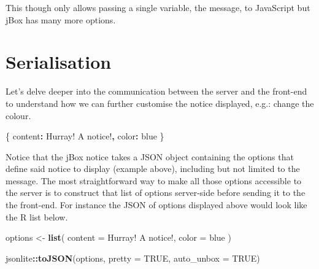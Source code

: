 \documentclass[
]{krantz}
\makeatletter
\newenvironment{Shaded}{\begin{snugshade}}{\end{snugshade}}
\newcommand{\DataTypeTok}[1]{\textcolor[rgb]{0.27,0.27,0.27}{#1}}
\newcommand{\KeywordTok}[1]{\textcolor[rgb]{0.27,0.27,0.27}{\textbf{#1}}}
\newcommand{\NormalTok}[1]{#1}
\newcommand{\OperatorTok}[1]{\textcolor[rgb]{0.43,0.43,0.43}{\textbf{#1}}}
\newcommand{\OtherTok}[1]{\textcolor[rgb]{0.37,0.37,0.37}{#1}}
\newcommand{\StringTok}[1]{\textcolor[rgb]{0.5,0.5,0.5}{#1}}
\newenvironment{kframe}{%
\medskip{}
\setlength{\fboxsep}{.8em}
 \def\at@end@of@kframe{}%
 \ifinner\ifhmode%
  \def\at@end@of@kframe{\end{minipage}}%
  \begin{minipage}{\columnwidth}%
 \fi\fi%
 \def\FrameCommand##1{\hskip\@totalleftmargin \hskip-\fboxsep
 \colorbox{shadecolor}{##1}\hskip-\fboxsep
     \hskip-\linewidth \hskip-\@totalleftmargin \hskip\columnwidth}%
 \MakeFramed {\advance\hsize-\width
   \@totalleftmargin\z@ \linewidth\hsize
   \@setminipage}}%
 {\par\unskip\endMakeFramed%
 \at@end@of@kframe}
\renewenvironment{Shaded}{\begin{kframe}}{\end{kframe}}
\makeatother
\begin{document}
\begin{Shaded}
\end{Shaded}

This though only allows passing a single variable, the message, to JavaScript but jBox has many more options.

\hypertarget{serialisation}{%
\section*{Serialisation}\label{serialisation}}


Let's delve deeper into the communication between the server and the front-end to understand how we can further customise the notice displayed, e.g.: change the colour.

\begin{Shaded}
\begin{Highlighting}[]
\NormalTok{\{}
  \DataTypeTok{content}\OperatorTok{:} \StringTok{\textquotesingle{}Hurray! A notice!\textquotesingle{}}\OperatorTok{,}
  \DataTypeTok{color}\OperatorTok{:} \StringTok{\textquotesingle{}blue\textquotesingle{}}
\NormalTok{\}}
\end{Highlighting}
\end{Shaded}

Notice that the jBox notice takes a JSON object containing the options that define said notice to display (example above), including but not limited to the message. The most straightforward way to make all those options accessible to the server is to construct that list of options server-side before sending it to the the front-end. For instance the JSON of options displayed above would look like the R list below.

\begin{Shaded}
\begin{Highlighting}[]
\NormalTok{options \textless{}{-}}\StringTok{ }\KeywordTok{list}\NormalTok{(}
  \DataTypeTok{content =} \StringTok{\textquotesingle{}Hurray! A notice!\textquotesingle{}}\NormalTok{,}
  \DataTypeTok{color =} \StringTok{\textquotesingle{}blue\textquotesingle{}}
\NormalTok{)}

\NormalTok{jsonlite}\OperatorTok{::}\KeywordTok{toJSON}\NormalTok{(options, }\DataTypeTok{pretty =} \OtherTok{TRUE}\NormalTok{, }\DataTypeTok{auto\_unbox =} \OtherTok{TRUE}\NormalTok{)}
\end{Highlighting}
\end{Shaded}
\end{document}
